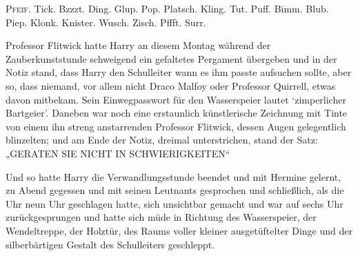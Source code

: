 

\lettrine{P}{feif.} Tick. Bzzzt. Ding. Glup. Pop. Platsch. Kling. Tut. Puff. Bimm. Blub. Piep. Klonk. Knister. Wusch. Zisch. Pffft. Surr.

Professor Flitwick hatte Harry an diesem Montag während der Zauberkunststunde schweigend ein gefaltetes Pergament übergeben und in der Notiz stand, dass Harry den Schulleiter wann es ihm passte aufsuchen sollte, aber so, dass niemand, vor allem nicht Draco Malfoy oder Professor Quirrell, etwas davon mitbekam. Sein Einwegpasswort für den Wasserspeier lautet `zimperlicher Bartgeier'.%
Daneben war noch eine erstaunlich künstlerische Zeichnung mit Tinte von einem ihn streng anstarrenden Professor Flitwick, dessen Augen gelegentlich blinzelten; und am Ende der Notiz, dreimal unterstrichen, stand der Satz: „GERATEN SIE NICHT IN SCHWIERIGKEITEN“

Und so hatte Harry die Verwandlungsstunde beendet und mit Hermine gelernt, zu Abend gegessen und mit seinen Leutnants gesprochen und schließlich, als die Uhr neun Uhr geschlagen hatte, sich unsichtbar gemacht und war auf sechs Uhr zurückgesprungen und hatte sich müde in Richtung des Wasserspeier, der Wendeltreppe, der Holztür, des Raums voller kleiner ausgetüftelter Dinge und der silberbärtigen Gestalt des Schulleiters geschleppt.

